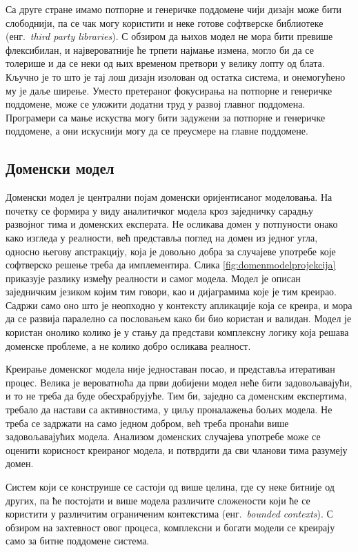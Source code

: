 \documentclass[12pt,oneside]{memoir}
\begin{document}
Са друге стране имамо потпорне и генеричке поддомене чији дизајн може бити слободнији, па се чак могу користити и неке готове софтверске библиотеке (енг.~\textit{third party libraries}). С обзиром да њихов модел не мора бити превише флексибилан, и највероватније ће трпети најмање измена, могло би да се толерише и да се неки од њих временом претвори у велику лопту од блата. Кључно је то што је тај лош дизајн изолован од остатка система, и онемогућено му је даље ширење. Уместо претераног фокусирања на потпорне и генеричке поддомене, може се уложити додатни труд у развој главног поддомена. Програмери са мање искуства могу бити задужени за потпорне и генеричке поддомене, а они искуснији могу да се преусмере на главне поддомене.

\subsection{Доменски модел}
Доменски модел је централни појам доменски оријентисаног моделовања. На почетку се формира у виду аналитичког модела кроз заједничку сарадњу развојног тима и доменских експерата. Не осликава домен у потпуности онако како изгледа у реалности, већ представља поглед на домен из једног угла, односно његову апстракцију, која је довољно добра за случајеве употребе које софтверско решење треба да имплементира. Слика \ref{fig:domenmodelprojekcija} приказује разлику између реалности и самог модела. Модел је описан заједничким језиком којим тим говори, као и дијаграмима које је тим креирао. Садржи само оно што је неопходно у контексту апликације која се креира, и мора да се развија паралелно са пословањем како би био користан и валидан. Модел је користан онолико колико је у стању да представи комплексну логику која решава доменске проблеме, а не колико добро осликава реалност.

Креирање доменског модела није једноставан посао, и представља итеративан процес. Велика је вероватноћа да први добијени модел неће бити задовољавајући, и то не треба да буде обесхрабрујуће. Тим би, заједно са доменским експертима, требало да настави са активностима, у циљу проналажења бољих модела. Не треба се задржати на само једном добром, већ треба пронаћи више задовољавајућих модела. Анализом доменских случајева употребе може се оценити корисност креираног модела, и потврдити да сви чланови тима разумеју домен.

Систем који се конструише се састоји од више целина, где су неке битније од других, па ће постојати и више модела различите сложености који ће се користити у различитим ограниченим контекстима (енг.~\textit{bounded contexts}). С обзиром на захтевност овог процеса, комплексни и богати модели се креирају само за битне поддомене система. 
\end{document}

